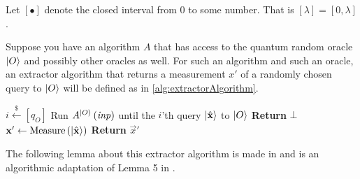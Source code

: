 Let $\left[\bullet\right]$ denote the closed interval from $0$ to some number. That is $\left[\lambda\right] = \left[0, \lambda\right]$.

Suppose you have an algorithm $A$ that has access to the quantum random oracle $\lvert O\rangle$ and possibly other oracles as well. For such an algorithm and such an oracle, an extractor algorithm that returns a measurement $x'$ of a randomly chosen query to $\lvert O\rangle$ will be defined as in \cref{alg:extractorAlgorithm}.

\begin{center}
	\begin{minipage}[ht!]{0.6\textwidth}
		\begin{algorithm}[H]
			\centering
			\caption{$EXT\left[A, \ket{O}\right]\left(\mathit{inp}\right)$}
			\label{alg:extractorAlgorithm}
			\begin{algorithmic}
				\State $i \xleftarrow{\$} \left[ q_{O} \right]$
				\State Run $A^{\lvert O\rangle}\left(\mathit{inp}\right)$ until the $i$'th query $\lvert\hat{\boldsymbol{\mathrm{x}}}\rangle$ to $\lvert O\rangle$
					\State \textbf{Return} $\bot$
				\Else
					\State $\boldsymbol{\mathrm{x}}' \leftarrow \mathrm{Measure}\left(\lvert\hat{\boldsymbol{\mathrm{x}}}\rangle\right)$
					\State \textbf{Return} $\vec{x}'$
				\EndIf
			\end{algorithmic}
		\end{algorithm}
	\end{minipage}
\end{center}

The following lemma about this extractor algorithm is made in \cite{HHK} and is an algorithmic adaptation of Lemma 5 in \cite{unruh}.

